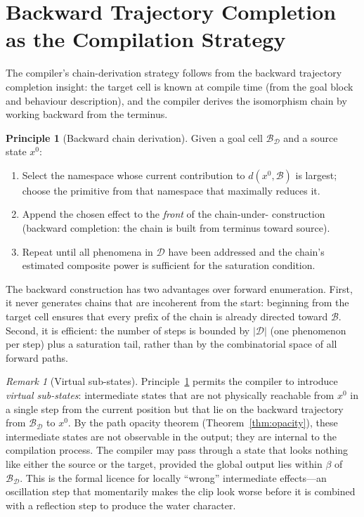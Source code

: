 \documentclass[twocolumn,11pt,a4paper]{article}
\theoremstyle{mee}
\theoremstyle{definition}
\newtheorem{principle}[theorem]{Principle}
\theoremstyle{remark}
\newtheorem{remark}[theorem]{Remark}
\newcommand{\BState}{\mathcal{B}}
\newcommand{\floor}{\beta}
\newcommand{\src}{x^{0}}
\newcommand{\Desc}{\mathcal{D}}
\newcommand{\dist}{d}
\begin{document}
\section{Backward Trajectory Completion as the Compilation Strategy}
\label{sec:backward}

The compiler's chain-derivation strategy follows from the backward
trajectory completion insight: the target cell is known at compile time
(from the goal block and behaviour description), and the compiler derives
the isomorphism chain by working backward from the terminus.

\begin{principle}[Backward chain derivation]
\label{prin:backward}
Given a goal cell $\BState_\Desc$ and a source state $\src$:
\begin{enumerate}[label=(\roman*),leftmargin=1.8em,itemsep=1pt]
\item Select the namespace whose current contribution to $\dist(\src,\BState)$
  is largest; choose the primitive from that namespace that maximally
  reduces it.
\item Append the chosen effect to the \emph{front} of the chain-under-
  construction (backward completion: the chain is built from terminus
  toward source).
\item Repeat until all phenomena in $\Desc$ have been addressed and the
  chain's estimated composite power is sufficient for the saturation
  condition.
\end{enumerate}
\end{principle}

The backward construction has two advantages over forward enumeration.
First, it never generates chains that are incoherent from the start:
beginning from the target cell ensures that every prefix of the chain is
already directed toward $\BState$. Second, it is efficient: the number of
steps is bounded by $|\Desc|$ (one phenomenon per step) plus a
saturation tail, rather than by the combinatorial space of all forward
paths.

\begin{remark}[Virtual sub-states]
\label{rem:virtual}
Principle~\ref{prin:backward} permits the compiler to introduce
\emph{virtual sub-states}: intermediate states that are not physically
reachable from $\src$ in a single step from the current position but that
lie on the backward trajectory from $\BState_\Desc$ to $\src$. By the
path opacity theorem (Theorem~\ref{thm:opacity}), these intermediate states
are not observable in the output; they are internal to the compilation
process. The compiler may pass through a state that looks nothing like
either the source or the target, provided the global output lies within
$\floor$ of $\BState_\Desc$. This is the formal licence for locally
``wrong'' intermediate effects---an oscillation step that momentarily
makes the clip look worse before it is combined with a reflection step to
produce the water character.
\end{remark}
\end{document}
